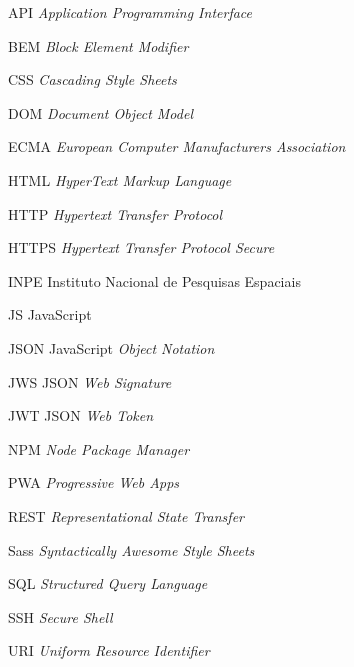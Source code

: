 \documentclass[
	12pt,				%
	openright,			%
	twoside,			%
	a4paper,			%
	english,			%
	brazil				%
	]{abntex2}
\begin{document}

\begin{siglas}
  \item[API] \textit{Application Programming Interface}
  \item[BEM] \textit{Block Element Modifier} 
  \item[CSS] \textit{Cascading Style Sheets}
  \item[DOM] \textit{Document Object Model}
  \item[ECMA] \textit{European Computer Manufacturers Association}
  \item[HTML] \textit{HyperText Markup Language}
  \item[HTTP] \textit{Hypertext Transfer Protocol}
  \item[HTTPS] \textit{Hypertext Transfer Protocol Secure}
  \item[INPE] Instituto Nacional de Pesquisas Espaciais
  \item[JS] JavaScript
  \item[JSON] JavaScript \textit{Object Notation}
  \item[JWS] JSON \textit{Web Signature}
  \item[JWT] JSON \textit{Web Token} 
  \item[NPM] \textit{Node Package Manager} 
  \item[PWA] \textit{Progressive Web Apps}
  \item[REST] \textit{Representational State Transfer}
  \item[Sass] \textit{Syntactically Awesome Style Sheets} 
  \item[SQL] \textit{Structured Query Language}
  \item[SSH] \textit{Secure Shell}  
  \item[URI] \textit{Uniform Resource Identifier}
\end{siglas}

\end{document}
